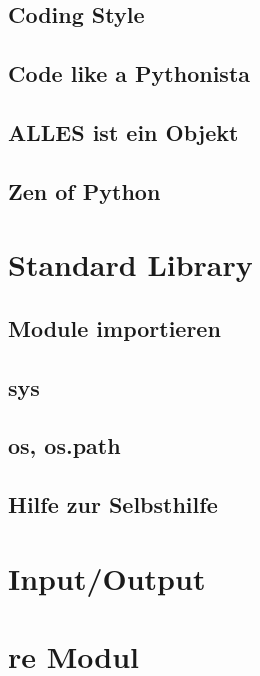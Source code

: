 \documentclass{beamer}
\begin{document}
\subsection{Coding Style}
\subsection{Code like a Pythonista} %
\subsection{ALLES ist ein Objekt}
\subsection{Zen of Python} %

\section{Standard Library}
\subsection{Module importieren}
\subsection{sys} %
\subsection{os, os.path} %
\subsection{Hilfe zur Selbsthilfe}  %

\section{Input/Output } %
\section{re Modul}
\end{document}
